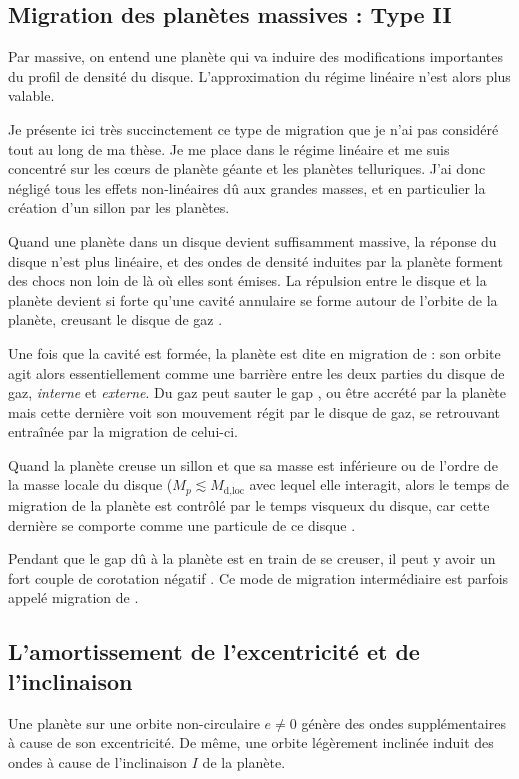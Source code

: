 \subsection{Migration des planètes massives : Type II}
Par massive, on entend une planète qui va induire des modifications importantes du profil de densité du disque. L'approximation du régime linéaire n'est alors plus valable. 

Je présente ici très succinctement ce type de migration que je n'ai pas considéré tout au long de ma thèse. Je me place dans le régime linéaire et me suis concentré sur les cœurs de planète géante et les planètes telluriques. J'ai donc négligé tous les effets non-linéaires dû aux grandes masses, et en particulier la création d'un sillon par les planètes.

\bigskip

Quand une planète dans un disque devient suffisamment massive, la réponse du disque n'est plus linéaire, et des ondes de densité induites par la planète forment des chocs non loin de là où elles sont émises. La répulsion entre le disque et la planète devient si forte qu'une cavité annulaire se forme autour de l'orbite de la planète, creusant le disque de gaz \citep{lin1986tidal}.

Une fois que la cavité est formée, la planète est dite en migration de  : son orbite agit alors essentiellement comme une barrière entre les deux parties du disque de gaz, \emph{interne} et \emph{externe}. Du gaz peut sauter le gap \citep{lubow2006gas}, ou être accrété par la planète mais cette dernière voit son mouvement régit par le disque de gaz, se retrouvant entraînée par la migration de celui-ci.

Quand la planète creuse un sillon et que sa masse est inférieure ou de l'ordre de la masse locale du disque ($M_p \lesssim M_\text{d,loc}$ avec lequel elle interagit, alors le temps de migration de la planète est contrôlé par le temps visqueux du disque, car cette dernière se comporte comme une particule de ce disque \citep{nelson2000migration}.

\bigskip

Pendant que le gap dû à la planète est en train de se creuser, il peut y avoir un fort couple de corotation négatif \citep{masset2003runaway}. Ce mode de migration intermédiaire est parfois appelé migration de . 

\subsection{L'amortissement de l'excentricité et de l'inclinaison}%
Une planète sur une orbite non-circulaire $e\neq 0$ génère des ondes supplémentaires à cause de son excentricité. De même, une orbite légèrement inclinée induit des ondes à cause de l'inclinaison $I$ de la planète. 

